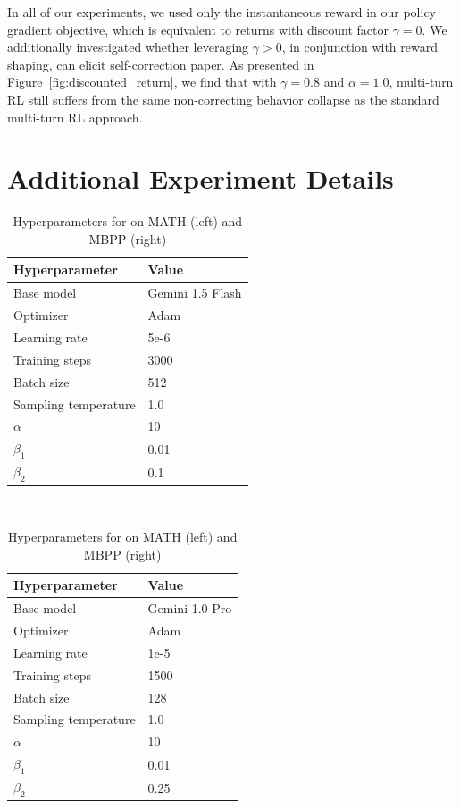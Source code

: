 \begin{appendix}
In all of our experiments, we used only the instantaneous reward in our policy gradient objective, which is equivalent to returns with discount factor $\gamma=0$. We additionally investigated whether leveraging $\gamma > 0$, in conjunction with reward shaping, can elicit self-correction paper. As presented in Figure~\ref{fig:discounted_return}, we find that with $\gamma=0.8$ and $\alpha=1.0$, multi-turn RL still suffers from the same non-correcting behavior collapse as the standard multi-turn RL approach.

\section{Additional Experiment Details}
\label{app:hparams}

\begin{table}[h]
\caption{Hyperparameters for \methodname{} on MATH (left) and MBPP (right)}
\label{tab:hparams}
\begin{minipage}{0.48\linewidth}
\begin{tabular}{ll}
\toprule
\textbf{Hyperparameter} & \textbf{Value}   \\ \midrule
Base model              & Gemini 1.5 Flash \\
Optimizer               & Adam             \\
Learning rate           & 5e-6             \\
Training steps          & 3000             \\
Batch size              & 512              \\
Sampling temperature    & 1.0              \\
$\alpha$                & 10               \\
$\beta_1$               & 0.01             \\
$\beta_2$               & 0.1              \\
\bottomrule             
\end{tabular}
\end{minipage}
~
\begin{minipage}{0.48\linewidth}
\begin{tabular}{ll}
\toprule
\textbf{Hyperparameter} & \textbf{Value}   \\ \midrule
Base model              & Gemini 1.0 Pro \\
Optimizer               & Adam             \\
Learning rate           & 1e-5             \\
Training steps          & 1500             \\
Batch size              & 128              \\
Sampling temperature    & 1.0              \\
$\alpha$                & 10               \\
$\beta_1$               & 0.01             \\
$\beta_2$               & 0.25              \\
\bottomrule             
\end{tabular}
\end{minipage}
\end{table}


\end{appendix}
